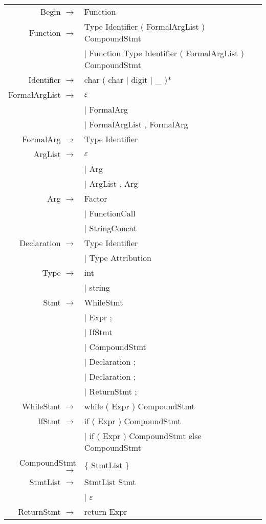 \documentclass[12pt]{article}
\begin{document}
\begin{longtable}{ r l }
	Begin 			$\rightarrow$ 	& Function \\
	Function 		$\rightarrow$ 	& Type Identifier ( FormalArgList ) CompoundStmt \\
									& $|$ Function Type Identifier ( FormalArgList ) CompoundStmt \\
	Identifier		$\rightarrow$   & char ( char $|$ digit $|$ \_ )* \\
	FormalArgList 	$\rightarrow$ 	& $\varepsilon$ \\
									& $|$ FormalArg \\
									& $|$ FormalArgList , FormalArg \\
	FormalArg 		$\rightarrow$ 	& Type Identifier \\
	ArgList			$\rightarrow$ 	& $\varepsilon$ \\
									& $|$ Arg \\
									& $|$ ArgList , Arg \\
	Arg				$\rightarrow$ 	& Factor \\
									& $|$ FunctionCall \\
									& $|$ StringConcat \\
	Declaration		$\rightarrow$ 	& Type Identifier \\
									& $|$ Type Attribution \\
	Type			$\rightarrow$ 	& int \\
									& $|$ string \\
	Stmt 			$\rightarrow$ 	& WhileStmt \\
									& $|$ Expr ; \\
									& $|$ IfStmt \\
									& $|$ CompoundStmt \\
									& $|$ Declaration ;\\
									& $|$ Declaration ; \\
									& $|$ ReturnStmt ; \\
	WhileStmt		$\rightarrow$ 	& while ( Expr ) CompoundStmt \\
	IfStmt			$\rightarrow$ 	& if ( Expr ) CompoundStmt \\
									& $|$ if ( Expr ) CompoundStmt else CompoundStmt \\
	CompoundStmt	$\rightarrow$ 	& \{ StmtList \} \\
	StmtList		$\rightarrow$ 	& StmtList Stmt \\
									& $|$ $\varepsilon$ \\
	ReturnStmt		$\rightarrow$ 	& return Expr \\

\end{longtable}
\end{document}
